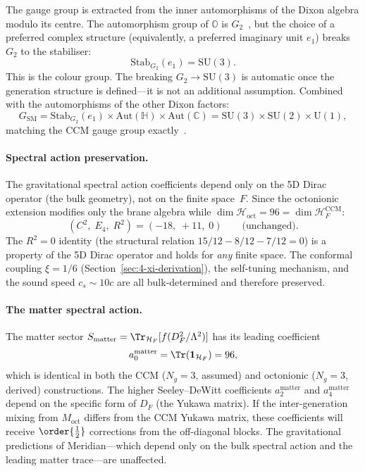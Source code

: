 The gauge group is extracted from the inner automorphisms of the Dixon algebra modulo its centre. The automorphism group of $\mathbb{O}$ is $G_2$~\cite{ch4:Baez2002}, but the choice of a preferred complex structure (equivalently, a preferred imaginary unit $e_1$) breaks $G_2$ to the stabiliser:
\begin{equation}
  \mathrm{Stab}_{G_2}(e_1) = \mathrm{SU}(3).
  \label{eq:4-91}
\end{equation}
This is the colour group. The breaking $G_2 \to \mathrm{SU}(3)$ is automatic once the generation structure is defined---it is not an additional assumption. Combined with the automorphisms of the other Dixon factors:
\begin{equation}
  G_{\mathrm{SM}} = \mathrm{Stab}_{G_2}(e_1) \times \mathrm{Aut}(\mathbb{H}) \times \mathrm{Aut}(\mathbb{C}) = \mathrm{SU}(3) \times \mathrm{SU}(2) \times \mathrm{U}(1),
  \label{eq:4-92}
\end{equation}
matching the CCM gauge group exactly~\cite{ch4:Krasnov2025,ch4:Furey2025}.

\paragraph{Spectral action preservation.}
The gravitational spectral action coefficients depend only on the 5D Dirac operator (the bulk geometry), not on the finite space~$F$. Since the octonionic extension modifies only the brane algebra while $\dim \mathcal{H}_{\mathrm{oct}} = 96 = \dim \mathcal{H}_F^{\mathrm{CCM}}$:
\begin{equation}
  (C^2,\; E_4,\; R^2) = (-18,\; +11,\; 0) \qquad \text{(unchanged)}.
  \label{eq:4-93}
\end{equation}
The $R^2 = 0$ identity (the structural relation $15/12 - 8/12 - 7/12 = 0$) is a property of the 5D Dirac operator and holds for \emph{any} finite space. The conformal coupling $\xi = 1/6$ (Section~\ref{sec:4-xi-derivation}), the self-tuning mechanism, and the sound speed $c_s \sim 10c$ are all bulk-determined and therefore preserved.

\paragraph{The matter spectral action.}
The matter sector $S_{\mathrm{matter}} = \Tr_{\mathcal{H}_F}[f(D_F^2/\Lambda^2)]$ has its leading coefficient
\begin{equation}
  a_0^{\mathrm{matter}} = \Tr(\mathbf{1}_{\mathcal{H}_F}) = 96,
  \label{eq:4-94}
\end{equation}
which is identical in both the CCM ($N_g = 3$, assumed) and octonionic ($N_g = 3$, derived) constructions. The higher Seeley--DeWitt coefficients $a_2^{\mathrm{matter}}$ and $a_4^{\mathrm{matter}}$ depend on the specific form of $D_F$ (the Yukawa matrix). If the inter-generation mixing from $M_{\mathrm{oct}}$ differs from the CCM Yukawa matrix, these coefficients will receive $\order{\tfrac{1}{2}}$ corrections from the off-diagonal blocks. The gravitational predictions of Meridian---which depend only on the bulk spectral action and the leading matter trace---are unaffected.


